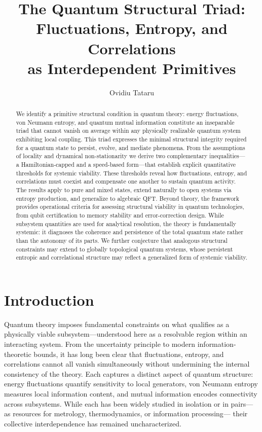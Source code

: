 \documentclass[10pt]{article}
\title{The Quantum Structural Triad: \\ Fluctuations, Entropy, and Correlations \\ as Interdependent Primitives}
\author{Ovidiu Tataru}
\date{}
\begin{document}
\maketitle
\begin{abstract}
We identify a primitive structural condition in quantum theory: energy fluctuations, von Neumann entropy, and quantum mutual information constitute an inseparable triad that cannot vanish on average within any physically realizable quantum system exhibiting local coupling. This triad expresses the minimal structural integrity required for a quantum state to persist, evolve, and mediate phenomena. From the assumptions of locality and dynamical non-stationarity we derive two complementary inequalities—a Hamiltonian-capped and a speed-based form—that establish explicit quantitative thresholds for systemic viability. These thresholds reveal how fluctuations, entropy, and correlations must coexist and compensate one another to sustain quantum activity. The results apply to pure and mixed states, extend naturally to open systems via entropy production, and generalize to algebraic QFT. Beyond theory, the framework provides operational criteria for assessing structural viability in quantum technologies, from qubit certification to memory stability and error-correction design. While subsystem quantities are used for analytical resolution, the theory is fundamentally systemic: it diagnoses the coherence and persistence of the total quantum state rather than the autonomy of its parts. We further conjecture that analogous structural constraints may extend to globally topological quantum systems, whose persistent entropic and correlational structure may reflect a generalized form of systemic viability.
\end{abstract}



\section{Introduction}

Quantum theory imposes fundamental constraints on what qualifies as a physically viable subsystem—understood here as a resolvable region within an interacting system.
From the uncertainty principle to modern information-theoretic bounds\cite{NielsenChuang2010,CsiszarKorner2011},
it has long been clear that fluctuations, entropy, and correlations cannot all vanish simultaneously
without undermining the internal consistency of the theory. Each captures a distinct aspect of quantum structure:
energy fluctuations quantify sensitivity to local generators\cite{BraunsteinCaves1994,Escher2011},
von Neumann entropy measures local information content\cite{Blanco2013,Horodecki2009},
and mutual information encodes connectivity across subsystems\cite{Safranek2017,Frowis2018}.
While each has been widely studied in isolation or in pairs—
as resources for metrology\cite{Taddei2013,DeffnerCampbell2017},
thermodynamics\cite{BrandaoHorodecki2015,Spohn1978},
or information processing\cite{BreuerPetruccione2002}—
their collective interdependence has remained uncharacterized.
\end{document}
